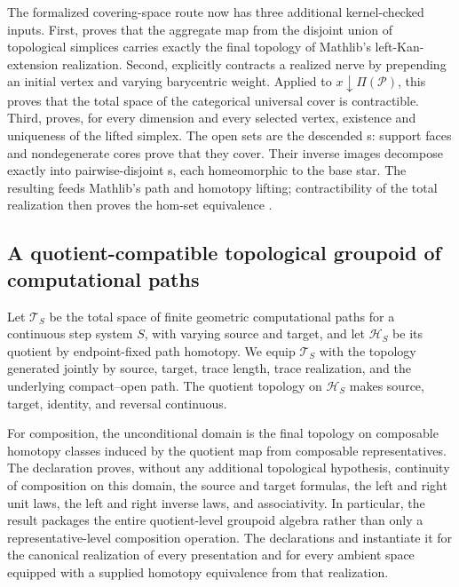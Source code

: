 \documentclass{lmcs}
\theoremstyle{definition}
\theoremstyle{plain}
\theoremstyle{remark}
\begin{document}
The formalized covering-space route now has three additional kernel-checked
inputs.  First,  proves that the aggregate
map from the disjoint union of topological simplices carries exactly the final
topology of Mathlib's left-Kan-extension realization.  Second,
 explicitly contracts a realized
nerve by prepending an initial vertex and varying barycentric weight.  Applied
to \(\mathord{x\!\downarrow\!\Pi(\mathcal P)}\), this proves that the total
space of the categorical universal cover is contractible.  Third,
 proves, for every dimension and every selected
vertex, existence and uniqueness of the lifted simplex.  The open sets are the
descended s: support faces and
nondegenerate cores prove that they cover.  Their inverse images decompose
exactly into pairwise-disjoint s, each homeomorphic to the
base star.  The resulting
 feeds Mathlib's path and homotopy lifting;
contractibility of the total realization then proves the hom-set equivalence
.

\subsection{A quotient-compatible topological groupoid of computational paths}

Let \(\mathcal T_S\) be the total space of finite geometric computational
paths for a continuous step system \(S\), with varying source and target, and
let \(\mathcal H_S\) be its quotient by endpoint-fixed path homotopy.  We equip
\(\mathcal T_S\) with the topology generated jointly by source, target, trace
length, trace realization, and the underlying compact--open path.  The quotient
topology on \(\mathcal H_S\) makes source, target, identity, and reversal
continuous.

For composition, the unconditional domain is the final topology on composable
homotopy classes induced by the quotient map from composable representatives.
The declaration
 proves, without any
additional topological hypothesis, continuity of composition on this domain,
the source and target formulas, the left and right unit laws, the left and
right inverse laws, and associativity.  In particular, the result packages the
entire quotient-level groupoid algebra rather than only a representative-level
composition operation.  The declarations
 and
 instantiate it for the
canonical realization of every presentation and for every ambient space
equipped with a supplied homotopy equivalence from that realization.
\end{document}
